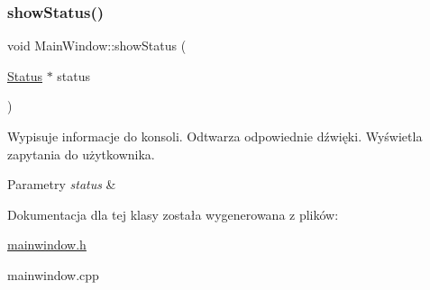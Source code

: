 \subsubsection{\texorpdfstring{showStatus()}{showStatus()}}
{\footnotesize\ttfamily void Main\+Window\+::show\+Status (\begin{DoxyParamCaption}\item[{\mbox{\hyperlink{classStatus}{Status}} $\ast$}]{status }\end{DoxyParamCaption})}



Wypisuje informacje do konsoli. Odtwarza odpowiednie dźwięki. Wyświetla zapytania do użytkownika. 


\begin{DoxyParams}{Parametry}
{\em status} & \\
\hline
\end{DoxyParams}


Dokumentacja dla tej klasy została wygenerowana z plików\+:\begin{DoxyCompactItemize}
\item 
\mbox{\hyperlink{mainwindow_8h}{mainwindow.\+h}}\item 
mainwindow.\+cpp\end{DoxyCompactItemize}
